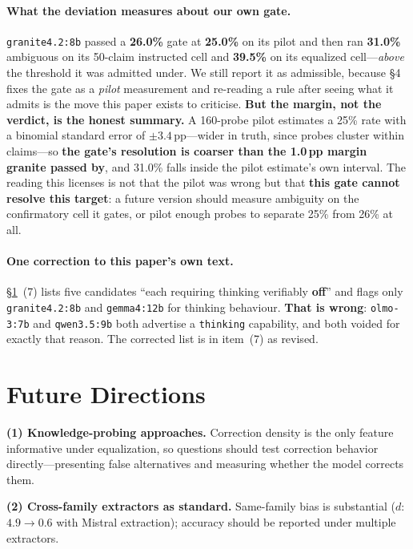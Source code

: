 \paragraph{What the deviation measures about our own gate.} \texttt{granite4.2:8b} passed a \textbf{26.0\%} gate at \textbf{25.0\%} on its pilot and then ran \textbf{31.0\%} ambiguous on its 50-claim instructed cell and \textbf{39.5\%} on its equalized cell---\emph{above} the threshold it was admitted under. We still report it as admissible, because §4 fixes the gate as a \emph{pilot} measurement and re-reading a rule after seeing what it admits is the move this paper exists to criticise. \textbf{But the margin, not the verdict, is the honest summary.} A 160-probe pilot estimates a 25\% rate with a binomial standard error of $\pm3.4$\,pp---wider in truth, since probes cluster within claims---so \textbf{the gate's resolution is coarser than the 1.0\,pp margin granite passed by}, and 31.0\% falls inside the pilot estimate's own interval. The reading this licenses is not that the pilot was wrong but that \textbf{this gate cannot resolve this target}: a future version should measure ambiguity on the confirmatory cell it gates, or pilot enough probes to separate 25\% from 26\% at all.

\paragraph{One correction to this paper's own text.} §\ref{app:future_directions}~(7) lists five candidates ``each requiring thinking verifiably \textbf{off}'' and flags only \texttt{granite4.2:8b} and \texttt{gemma4:12b} for thinking behaviour. \textbf{That is wrong}: \texttt{olmo-3:7b} and \texttt{qwen3.5:9b} both advertise a \texttt{thinking} capability, and both voided for exactly that reason. The corrected list is in item~(7) as revised.

\section{Future Directions}\label{app:future_directions}

\textbf{(1) Knowledge-probing approaches.} Correction density is the only feature informative under equalization, so questions should test correction behavior directly---presenting false alternatives and measuring whether the model corrects them.

\textbf{(2) Cross-family extractors as standard.} Same-family bias is substantial ($d$: $4.9 \to 0.6$ with Mistral extraction); accuracy should be reported under multiple extractors.

